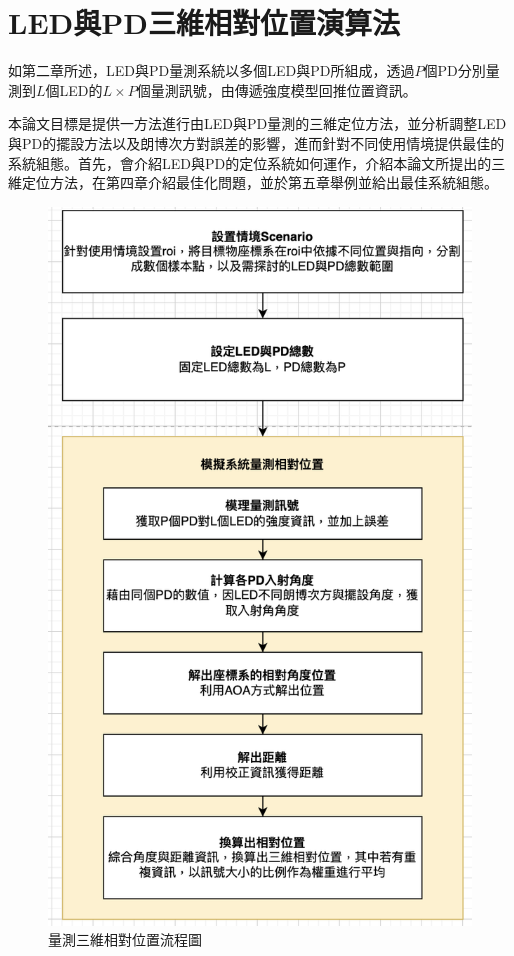 
\chapter{LED與PD三維相對位置演算法}
\label{chp:3}

如第二章所述，LED與PD量測系統以多個LED與PD所組成，透過$P$個PD分別量測到$L$個LED的$L\times P$個量測訊號，由傳遞強度模型回推位置資訊。

本論文目標是提供一方法進行由LED與PD量測的三維定位方法，並分析調整LED與PD的擺設方法以及朗博次方對誤差的影響，進而針對不同使用情境提供最佳的系統組態。首先，會介紹LED與PD的定位系統如何運作，介紹本論文所提出的三維定位方法，在第四章介紹最佳化問題，並於第五章舉例並給出最佳系統組態。

\begin{figure}[ht]
    \centering
    \includegraphics[width=12cm]{ch3pic/flowchart_pos.png}
    \caption{量測三維相對位置流程圖}
    \label{flow:pos}
\end{figure}



